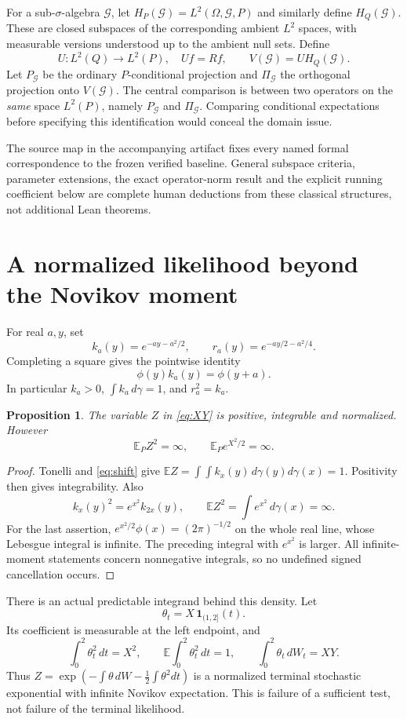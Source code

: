 \documentclass[11pt]{article}
\newtheorem{proposition}[theorem]{Proposition}
\theoremstyle{remark}\newtheorem{remark}[theorem]{Remark}
\newcommand{\E}{\mathbb E}
\newcommand{\G}{\mathcal G}
\begin{document}
For a sub-$\sigma$-algebra $\G$, let $H_P(\G)=L^2(\Omega,\G,P)$ and similarly define $H_Q(\G)$. These are closed subspaces of the corresponding ambient $L^2$ spaces, with measurable versions understood up to the ambient null sets. Define
\[
 U:L^2(Q)\longrightarrow L^2(P),\quad Uf=Rf,
 \qquad V(\G)=U H_Q(\G).
\]
Let $P_\G$ be the ordinary $P$-conditional projection and $\Pi_\G$ the orthogonal projection onto $V(\G)$. The central comparison is between two operators on the \emph{same} space $L^2(P)$, namely $P_\G$ and $\Pi_\G$. Comparing conditional expectations before specifying this identification would conceal the domain issue.

The source map in the accompanying artifact fixes every named formal correspondence to the frozen verified baseline. General subspace criteria, parameter extensions, the exact operator-norm result and the explicit running coefficient below are complete human deductions from these classical structures, not additional Lean theorems.

\section{A normalized likelihood beyond the Novikov moment}
For real $a,y$, set
\[
 k_a(y)=e^{-ay-a^2/2},\qquad r_a(y)=e^{-ay/2-a^2/4}.
\]
Completing a square gives the pointwise identity
\begin{equation}\label{eq:shift}
 \phi(y)k_a(y)=\phi(y+a).
\end{equation}
In particular $k_a>0$, $\int k_a\,d\gamma=1$, and $r_a^2=k_a$.

\begin{proposition}\label{prop:normal}
The variable $Z$ in \eqref{eq:XY} is positive, integrable and normalized. However
\[
 \E_P Z^2=\infty,\qquad \E_P e^{X^2/2}=\infty.
\]
\end{proposition}
\begin{proof}
Tonelli and \eqref{eq:shift} give
$\E Z=\int\int k_x(y)\,d\gamma(y)d\gamma(x)=1$. Positivity then gives integrability. Also
\[
 k_x(y)^2=e^{x^2}k_{2x}(y),\qquad
 \E Z^2=\int e^{x^2}\,d\gamma(x)=\infty.
\]
For the last assertion, $e^{x^2/2}\phi(x)=(2\pi)^{-1/2}$ on the whole real line, whose Lebesgue integral is infinite. The preceding integral with $e^{x^2}$ is larger. All infinite-moment statements concern nonnegative integrals, so no undefined signed cancellation occurs.
\end{proof}

There is an actual predictable integrand behind this density. Let
\[
 \theta_t=X\,\mathbf1_{(1,2]}(t).
\]
Its coefficient is measurable at the left endpoint, and
\[
 \int_0^2\theta_t^2\,dt=X^2,\qquad
 \E\int_0^2\theta_t^2\,dt=1,\qquad
 \int_0^2\theta_t\,dW_t=XY.
\]
Thus $Z=\exp(-\int\theta\,dW-\frac12\int\theta^2dt)$ is a normalized terminal stochastic exponential with infinite Novikov expectation. This is failure of a sufficient test, not failure of the terminal likelihood.
\end{document}
